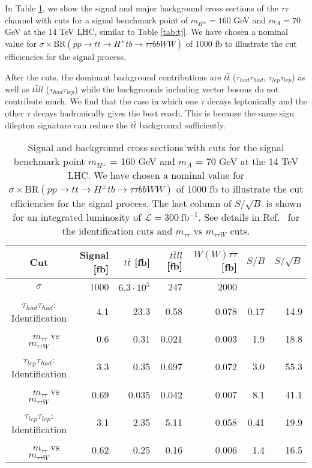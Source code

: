 In Table \ref{tab:tt}, we show the signal and major background cross sections of the $\tau\tau$ channel with cuts for a signal benchmark point of $m_{H^{\pm}} = 160$ GeV and $m_A = 70$ GeV at the 14 TeV LHC, similar to Table \ref{tab:tj}. We have chosen a nominal value for $\sigma \times \text{BR}(pp \rightarrow tt \rightarrow H^{\pm} tb \rightarrow \tau\tau bb WW)$ of 1000 fb to illustrate the cut efficiencies for the signal process. 

After the cuts, the dominant background contributions are $t\bar{t}$ ($\tau_{had}\tau_{had}$, $\tau_{lep}\tau_{lep}$) as well as $t\bar{t}ll$ ($\tau_{had}\tau_{lep}$) while the backgrounds including vector bosons do not contribute much. We find that the case in which one $\tau$ decays leptonically and the other $\tau$ decays hadronically gives the best reach. This is because the same sign dilepton signature can reduce the $t\bar{t}$ background sufficiently. 

 
\begin{table}[h]
\centering
\resizebox{14cm}{!} {
\begin{tabular}{ |c | r |r r r |r r|} \hline
Cut 		 								&Signal [fb] 	&$t\bar{t}$ [fb] 		&$t\bar{t}ll$ [fb]	&$W(W)\tau\tau$ [fb]	&$S/B$	&$S/\sqrt{B}$	\\
\hline
$\sigma$ 								&1000 		&$6.3 \cdot 10^5$	& 247 		 	& 2000 		 &		 	 &		 \\
\hline
$\tau_{had}\tau_{had}$: Identification 		 			&4.1	 		&   23.3 		& 0.58			 			& 0.078  		& 0.17	&	14.9		\\
\ \ \ $m_{\tau\tau}$ vs $m_{\tau\tau W}$ 			&0.6 		&   0.31 		& 0.021 			 			& 0.003  		& 1.9 	&	18.8		\\
\hline
 $\tau_{lep}\tau_{had}$: Identification 	 				&3.3 			&   0.35 		& 0.697 			 			& 0.072  		& 3.0		&	55.3		\\
 \ \ \ $m_{\tau\tau}$ vs $m_{\tau\tau W}$ 			&0.69 		&   0.035 		& 0.042 			 			& 0.007 		& 8.1		&	41.1		\\
\hline
 $\tau_{lep}\tau_{lep}$: Identification 	 				&3.1			&   2.35 		& 5.11 			 				& 0.058  		& 0.41	&	19.9		\\
 \ \ \ $m_{\tau\tau}$ vs $m_{\tau\tau W}$ 			&0.62 		&   0.25 		& 0.16 			 				& 0.006   	& 1.4		&	16.5		\\
 \hline
\end{tabular}
}
\caption{Signal and background cross sections with cuts for the signal benchmark point $m_{H^{\pm}}$ = 160 GeV and $m_A$ = 70 GeV at the 14 TeV LHC. We have chosen a nominal value for $\sigma \times \text{BR}(pp \rightarrow tt \rightarrow H^{\pm} tb \rightarrow \tau\tau bb WW)$ of 1000 fb to illustrate the cut efficiencies for the signal process. The last column of $S/\sqrt{B}$ is shown for an integrated luminosity of $\mathcal{L}=300\ \text{fb}^{-1}$. See details in Ref.~\cite{Coleppa:2014cca} for the identification cuts and $m_{\tau\tau}$ vs $m_{\tau\tau W}$ cuts.  }
\label{tab:tt}
\end{table}

